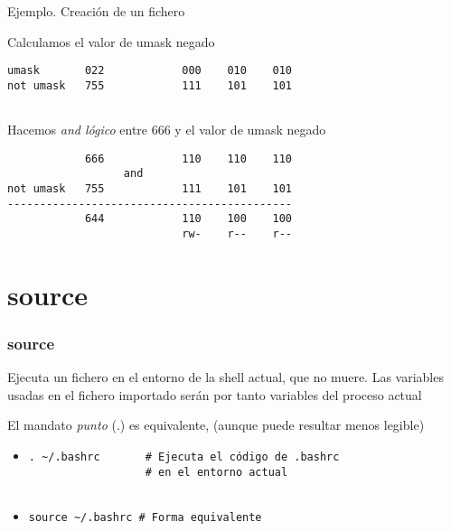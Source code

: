 \documentclass[ucs]{beamer}
\begin{document}
\begin{frame}[fragile]
Ejemplo. Creación de un fichero

Calculamos el valor de umask negado
\begin{verbatim}
umask       022            000    010    010
not umask   755            111    101    101


\end{verbatim}

Hacemos \emph{and lógico} entre 666 y el valor de umask negado

\begin{verbatim}
            666            110    110    110
                  and
not umask   755            111    101    101
--------------------------------------------
            644            110    100    100 
                           rw-    r--    r--
\end{verbatim}

\end{frame}



\section{source}


\begin{frame}[fragile]
\frametitle{source}

Ejecuta un fichero en el entorno de la shell actual, que no muere.
Las variables usadas en el
fichero importado serán por tanto variables del proceso actual

El mandato \emph{punto} (.) es equivalente, (aunque puede resultar menos legible)

\begin{itemize}	
\item
\begin{verbatim}
. ~/.bashrc       # Ejecuta el código de .bashrc 
                  # en el entorno actual
 
\end{verbatim}
\item 
\begin{verbatim}
source ~/.bashrc # Forma equivalente 
\end{verbatim}
\end{itemize}
\end{frame}
\end{document}

